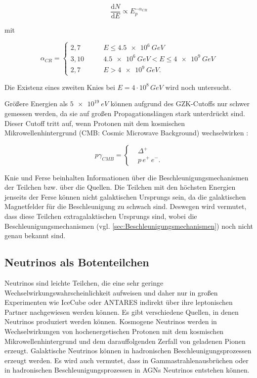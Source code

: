 \begin{equation}
 \frac{\mathrm{d}N}{\mathrm{d}E} \propto E_p^{-\alpha_{CR}}
\end{equation}

mit \cite{Knie} 

\begin{equation*}
\alpha_{CR}=	
\left\{
\begin{aligned}
2,7 \qquad &E   \leq \SI{4,5e6}{GeV} \\
3,10 \qquad &  \SI{4,5e6}{GeV} < E  \leq \SI{4e9}{GeV} \\ 
2,7 \qquad & E > \SI{4e9}{GeV}.
\end{aligned}
\right.
\end{equation*}

Die Existenz eines zweiten Knies bei $E=4\cdot 10^8\,\si{GeV}$\cite{Knie} wird noch untersucht.

Größere Energien als $\SI{5e19}{eV}$ können aufgrund des GZK-Cutoffs \cite{Greisen}\cite{ZatsepinKuzmin} nur schwer gemessen werden, da sie auf großen Propagationslängen stark unterdrückt sind. 
Dieser Cutoff tritt auf, wenn Protonen mit dem kosmischen Mikrowellenhintergrund (CMB: Cosmic Microwave Background) wechselwirken \cite{Greisen}\cite{ZatsepinKuzmin}: 

\begin{equation*}
p\gamma_{CMB}=	
\left\{
\begin{aligned}
& \Delta^+ \\
& p\, e^+ \, e^- .
\end{aligned}
\right.
\end{equation*}

Knie und Ferse beinhalten Informationen über die Beschleunigungsmechanismen der Teilchen bzw. über die Quellen.
Die Teilchen mit den höchsten Energien jenseits der Ferse können nicht galaktischen Ursprungs sein, da die galaktischen Magnetfelder für die Beschleunigung zu schwach sind. 
Deswegen wird vermutet, dass diese Teilchen extragalaktischen Ursprungs sind, wobei die Beschleunigungsmechanismen (vgl. \autoref{sec:Beschleunigungsmechanismen}) noch nicht genau bekannt sind.

\subsection{Neutrinos als Botenteilchen}
Neutrinos sind leichte Teilchen, die eine sehr geringe Wechselwirkungswahrscheinlichkeit aufweisen und daher nur in großen Experimenten wie IceCube \cite{Icecube} oder ANTARES \cite{ANTARES} indirekt über ihre leptonischen Partner nachgewiesen werden können.
Es gibt verschiedene Quellen, in denen Neutrinos produziert werden können.
Kosmogene Neutrinos werden in Wechselwirkungen von hochenergetischen Protonen mit dem kosmischen Mikrowellenhintergrund und dem darauffolgenden Zerfall von geladenen Pionen erzeugt.
Galaktische Neutrinos können in hadronischen Beschleunigungsprozessen erzeugt werden.
Es wird auch vermutet, dass in Gammastrahlenausbrüchen oder in hadronischen Beschleunigungsprozessen in AGNs Neutrinos entstehen können.

